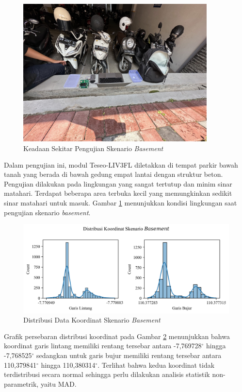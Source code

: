 \begin{figure}[H]
	\centering
	\includegraphics[width=10cm]{contents/chapter-4/1-skenario-basement/keadaan.jpg}
	\caption{Keadaan Sekitar Pengujian Skenario \textit{Basement}}
	\label{Fig: basement-keadaan}
\end{figure}

Dalam pengujian ini, modul Teseo-LIV3FL diletakkan di tempat parkir bawah tanah yang berada di bawah gedung empat lantai dengan struktur beton. Pengujian dilakukan pada lingkungan yang sangat tertutup dan minim sinar matahari. Terdapat beberapa area terbuka kecil yang memungkinkan sedikit sinar matahari untuk masuk. Gambar \ref{Fig: basement-keadaan} menunjukkan kondisi lingkungan saat pengujian skenario \textit{basement}.

\begin{figure}[H]
	\centering
	\begin{adjustbox}{width=\textwidth}
		\includegraphics{contents/chapter-4/1-skenario-basement/distribution.png}
	\end{adjustbox}
	\caption{Distribusi Data Koordinat Skenario \textit{Basement}}
	\label{Fig:basement-distribution}
\end{figure}

Grafik persebaran distribusi koordinat pada Gambar \ref{Fig:basement-distribution} menunjukkan bahwa koordinat garis lintang memiliki rentang tersebar antara -7,769728$^{\circ}$ hingga -7,768525$^{\circ}$ sedangkan untuk garis bujur memiliki rentang tersebar antara 110,379841$^{\circ}$ hingga 110,380314$^{\circ}$. Terlihat bahwa kedua koordinat tidak terdistribusi secara normal sehingga perlu dilakukan analisis statistik non-parametrik, yaitu MAD.

